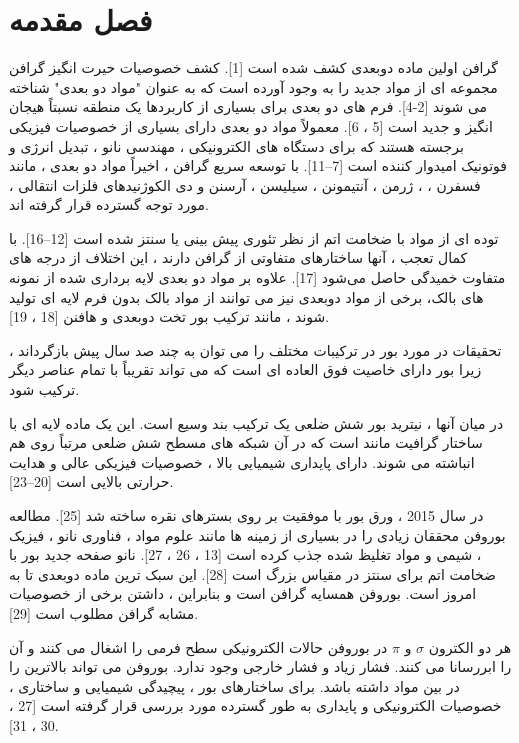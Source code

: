﻿\chapter{فصل مقدمه} 
\newpage
گرافن اولین ماده دوبعدی کشف شده است [1]. کشف خصوصیات حیرت انگیز گرافن مجموعه ای از مواد جدید را به وجود آورده است که به عنوان "مواد دو بعدی" شناخته می شوند [2-4]. فرم های دو بعدی برای بسیاری از کاربردها یک منطقه نسبتاً هیجان انگیز و جدید است [5 ، 6]. معمولاً مواد دو بعدی دارای بسیاری از خصوصیات فیزیکی برجسته هستند که برای دستگاه های الکترونیکی ، مهندسی نانو ، تبدیل انرژی و فوتونیک امیدوار کننده است [7–11]. با توسعه سریع گرافن ، اخیراً مواد دو بعدی ، مانند فسفرن ، 
 ، ژرمن ، آنتیمونن ، سیلیسن ، آرسنن و دی الكوژنیدهای فلزات انتقالی ، مورد توجه گسترده قرار گرفته اند.

توده ای از مواد با ضخامت اتم از نظر تئوری پیش بینی یا سنتز شده است [12–16]. با کمال تعجب ، آنها ساختارهای متفاوتی از گرافن دارند ، این اختلاف از درجه های متفاوت خمیدگی حاصل می‌شود [17]. علاوه بر مواد دو بعدی لایه برداری شده از نمونه های بالک، برخی از مواد دوبعدی نیز می توانند از مواد بالک بدون فرم لایه ای تولید شوند ، مانند ترکیب بور تخت دوبعدی   و هافنن [18 ، 19].

تحقیقات در مورد بور در ترکیبات مختلف را می توان به چند صد سال پیش بازگرداند ، زیرا بور دارای خاصیت فوق العاده ای است که می تواند تقریباً با تمام عناصر دیگر ترکیب شود.


در میان آنها ، نیترید بور شش ضلعی  یک ترکیب بند وسیع  است. این یک ماده لایه ای با ساختار گرافیت مانند است که در آن شبکه های مسطح شش ضلعی  مرتباً روی هم انباشته می شوند.  دارای پایداری شیمیایی بالا ، خصوصیات فیزیکی عالی و هدایت حرارتی بالایی است [20–23].

در سال 2015 ، ورق بور  با موفقیت بر روی بسترهای نقره   ساخته شد [25]. مطالعه بوروفن محققان زیادی را در بسیاری از زمینه ها مانند علوم مواد ، فناوری نانو ، فیزیک ، شیمی و مواد تغلیظ شده جذب کرده است [13 ، 26 ، 27].  نانو صفحه جدید بور با ضخامت اتم برای سنتز در مقیاس بزرگ است [28]. این سبک ترین ماده دوبعدی تا به امروز است. بوروفن همسایه گرافن است و بنابراین ، داشتن برخی از خصوصیات مشابه گرافن مطلوب است [29].

هر دو الکترون $\sigma$ و $\pi$ در بوروفن حالات الکترونیکی سطح فرمی را اشغال می کنند و آن را ابررسانا می کنند. فشار زیاد و فشار خارجی وجود ندارد. بوروفن می تواند بالاترین  را در بین مواد  داشته باشد. برای ساختارهای بور ، پیچیدگی شیمیایی و ساختاری ، خصوصیات الکترونیکی و پایداری به طور گسترده مورد بررسی قرار گرفته است [27 ، 30 ، 31].

